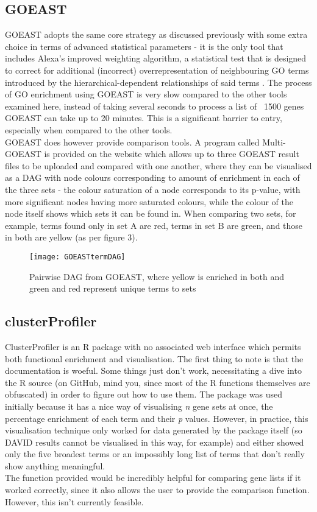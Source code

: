 \documentclass[11pt, oneside]{article}
\begin{document}
\subsection*{GOEAST}
GOEAST adopts the same core strategy as discussed previously with some extra choice in terms of advanced statistical parameters - it is the only tool that includes Alexa's improved weighting algorithm, a statistical test that is designed to correct for additional (incorrect) overrepresentation of neighbouring GO terms introduced by the hierarchical-dependent relationships of said terms \cite{GOEast08}. The process of GO enrichment using GOEAST is very slow compared to the other tools examined here, instead of taking several seconds to process a list of ~1500 genes GOEAST can take up to 20 minutes. This is a significant barrier to entry, especially when compared to the other tools.\\
GOEAST does however provide comparison tools. A program called Multi-GOEAST is provided on the website which allows up to three GOEAST result files to be uploaded and compared with one another, where they can be visualised as a DAG with node colours corresponding to amount of enrichment in each of the three sets - the colour saturation of a node corresponds to its p-value, with more significant nodes having more saturated colours, while the colour of the node itself shows which sets it can be found in. When comparing two sets, for example, terms found only in set A are red, terms in set B are green, and those in both are yellow (as per figure 3). 
\begin{figure}[h!]
	\texttt{[image: GOEASTtermDAG]}
	\caption{Pairwise DAG from GOEAST, where yellow is enriched in both and green and red represent unique terms to sets}
\end{figure}

\subsection*{clusterProfiler}
ClusterProfiler is an R package with no associated web interface which permits both functional enrichment and visualisation. The first thing to note is that the documentation is woeful. Some things just don't work, necessitating a dive into the R source (on GitHub, mind you, since most of the R functions themselves are obfuscated) in order to figure out how to use them. The package was used initially because it has a nice way of visualising \emph{n} gene sets at once, the percentage enrichment of each term and their \emph{p} values. However, in practice, this visualisation technique only worked for data generated by the package itself (so DAVID results cannot be visualised in this way, for example) and either showed only the five broadest terms or an impossibly long list of terms that don't really show anything meaningful.\\
The function provided would be incredibly helpful for comparing gene lists if it worked correctly, since it also allows the user to provide the comparison function. However, this isn't currently feasible.
\end{document}
